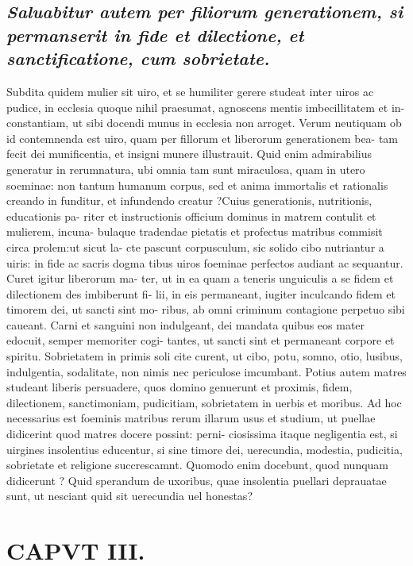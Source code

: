 \documentclass{article}
\begin{document}
\begin{pages}
\subsection*{\textit{Saluabitur autem per filiorum generationem, si permanserit in fide et dilectione, et sanctificatione, cum sobrietate. }}\pstart Subdita quidem mulier sit uiro, et se humiliter gerere studeat inter uiros ac pudice, in ecclesia quoque nihil praesumat, agnoscens mentis imbecillitatem et in- constantiam, ut sibi docendi munus in ecclesia non arroget. Verum neutiquam ob id contemnenda est uiro, quam per fillorum et liberorum generationem bea- tam fecit dei munificentia, et insigni munere illustrauit. Quid enim admirabilius generatur in rerumnatura, ubi omnia tam sunt miraculosa, quam in utero soeminae: non tantum humanum corpus, sed et anima immortalis et rationalis creando in funditur, et infundendo creatur ?Cuius generationis, nutritionis, educationis pa- riter et instructionis officium dominus in matrem contulit et mulierem, incuna- bulaque tradendae pietatis et profectus matribus commisit circa prolem:ut sicut la- cte pascunt corpusculum, sic solido cibo nutriantur a uiris: in fide ac sacris dogma tibus uiros foeminae perfectos audiant ac sequantur. Curet igitur liberorum ma- ter, ut in ea quam a teneris unguiculis a se fidem et dilectionem des imbiberunt fi- lii, in eis permaneant, iugiter inculcando fidem et timorem dei, ut sancti sint mo- ribus, ab omni criminum contagione perpetuo sibi caueant. Carni et sanguini non indulgeant, dei mandata quibus eos mater edocuit, semper memoriter cogi- tantes, ut sancti sint et permaneant corpore et spiritu. Sobrietatem in primis soli cite curent, ut cibo, potu, somno, otio, lusibus, indulgentia, sodalitate, non nimis nec periculose imcumbant. Potius autem matres studeant liberis persuadere, quos domino genuerunt et proximis, fidem, dilectionem, sanctimoniam, pudicitiam, sobrietatem in uerbis et moribus. Ad hoc necessarius est foeminis matribus rerum illarum usus et studium, ut puellae didicerint quod matres docere possint: perni- ciosissima itaque negligentia est, si uirgines insolentius educentur, si sine timore dei, uerecundia, modestia, pudicitia, sobrietate et religione succrescamnt. Quomodo enim docebunt, quod nunquam didicerunt ? Quid sperandum de uxoribus, quae insolentia puellari deprauatae sunt, ut nesciant quid sit uerecundia uel honestas?  \pend
\endnumbering\beginnumbering\section{CAPVT III.}
{}

\end{pages}
\end{document}

